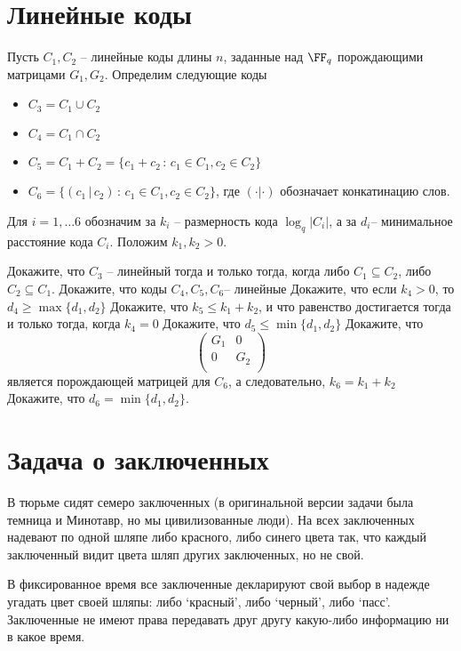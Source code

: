 \documentclass[11pt]{exam}
\theoremstyle{definition}
\begin{document}
{	\section{Линейные коды}
		Пусть $C_1, C_2$ -- линейные коды длины $n$, заданные над $\FF_q$ порождающими матрицами $G_1, G_2$. Определим следующие коды
		\begin{itemize}
			\item $C_3 = C_1 \cup C_2$
			\item $C_4 = C_1 \cap C_2$
			\item $C_5 = C_1 + C_2 = \{  c_1 + c_2 \, : \, c_1 \in C_1, c_2 \in C_2 \}$
			\item $C_6 = \{  (c_1 \, |\, c_2 ) \, : \, c_1 \in C_1, c_2 \in C_2 \}$, где $(\cdot|\cdot)$ обозначает конкатинацию слов. 
		\end{itemize}
		Для $i = 1, \ldots 6$ обозначим за $k_i$ -- размерность кода $\log_q |C_i|$, а за $d_i$-- минимальное расстояние кода $C_i$. Положим $k_1, k_2 >0$.
	 	\begin{questions}
	 		\question Докажите, что $C_3$ -- линейный тогда и только тогда, когда либо $C_1 \subseteq C_2$, либо $C_2 \subseteq C_1$.
	 		\question Докажите, что коды $C_4, C_5, C_6$-- линейные
	 		\question Докажите, что если $k_4>0$, то $d_4 \geq \max\{d_1, d_2\}$
	 		\question Докажите, что $k_5 \leq k_1 + k_2$, и что равенство достигается тогда и только тогда, когда $k_4 = 0$
	 		\question Докажите, что $d_5 \leq \min\{ d_1, d_2\}$
	 		\question Докажите, что 
	 		\[
	 			\begin{pmatrix}
	 			G_1 & 0 \\
	 			0 & G_2 \\
	 			\end{pmatrix}
	 		\]
	 		является порождающей матрицей для $C_6$, а следовательно, $k_6 = k_1 + k_2$
	 		\question Докажите, что $d_6 = \min\{d_1, d_2\}$.
	 	\end{questions}
 	
\section{Задача о заключенных}

В тюрьме сидят семеро заключенных (в оригинальной версии задачи была темница и Минотавр, но мы цивилизованные люди). На всех заключенных надевают по одной шляпе либо красного, либо синего цвета так, что каждый заключенный видит цвета шляп других заключенных, но не свой.

В фиксированное время все заключенные декларируют свой выбор в надежде угадать цвет своей шляпы: либо `красный', либо `черный', либо `пасс'.  Заключенные не имеют права передавать друг другу какую-либо информацию ни в какое время.

}
\end{document}
